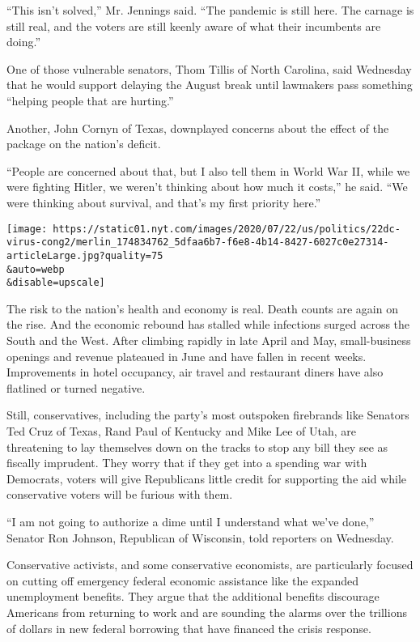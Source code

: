 ``This isn't solved,'' Mr. Jennings said. ``The pandemic is still here.
The carnage is still real, and the voters are still keenly aware of what
their incumbents are doing.''

One of those vulnerable senators, Thom Tillis of North Carolina, said
Wednesday that he would support delaying the August break until
lawmakers pass something ``helping people that are hurting.''

Another, John Cornyn of Texas, downplayed concerns about the effect of
the package on the nation's deficit.

``People are concerned about that, but I also tell them in World War II,
while we were fighting Hitler, we weren't thinking about how much it
costs,'' he said. ``We were thinking about survival, and that's my first
priority here.''

\texttt{[image: https://static01.nyt.com/images/2020/07/22/us/politics/22dc-virus-cong2/merlin\_174834762\_5dfaa6b7-f6e8-4b14-8427-6027c0e27314-articleLarge.jpg?quality=75\\\&auto=webp\\\&disable=upscale]}

The risk to the nation's health and economy is real. Death counts are
again on the rise. And the economic rebound has stalled while infections
surged across the South and the West. After climbing rapidly in late
April and May, small-business openings and revenue plateaued in June and
have fallen in recent weeks. Improvements in hotel occupancy, air travel
and restaurant diners have also flatlined or turned negative.

Still, conservatives, including the party's most outspoken firebrands
like Senators Ted Cruz of Texas, Rand Paul of Kentucky and Mike Lee of
Utah, are threatening to lay themselves down on the tracks to stop any
bill they see as fiscally imprudent. They worry that if they get into a
spending war with Democrats, voters will give Republicans little credit
for supporting the aid while conservative voters will be furious with
them.

``I am not going to authorize a dime until I understand what we've
done,'' Senator Ron Johnson, Republican of Wisconsin, told reporters on
Wednesday.

Conservative activists, and some conservative economists, are
particularly focused on cutting off emergency federal economic
assistance like the expanded unemployment benefits. They argue that the
additional benefits discourage Americans from returning to work and are
sounding the alarms over the trillions of dollars in new federal
borrowing that have financed the crisis response.

